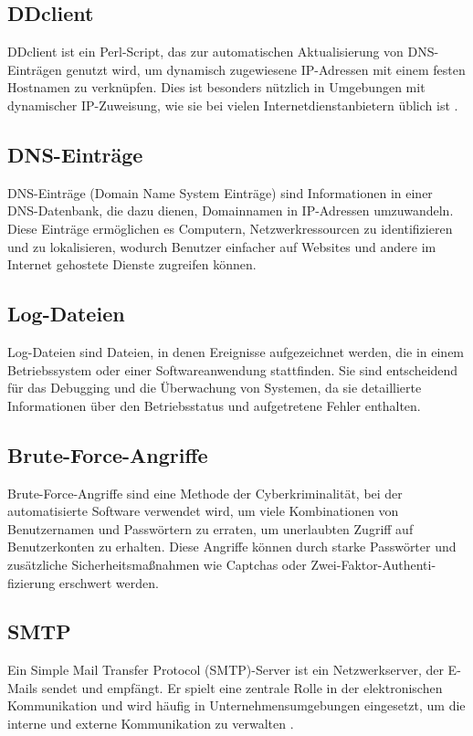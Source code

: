 \subsection{DDclient}
\label{subsec:ddclient}
DDclient ist ein Perl-Script, das zur automatischen Aktualisierung von DNS-Einträgen genutzt wird, um dynamisch zugewiesene IP-Adressen mit einem festen Hostnamen zu verknüpfen. Dies ist besonders nützlich in Umgebungen mit dynamischer IP-Zuweisung, wie sie bei vielen Internetdienstanbietern üblich ist \cite{Ddclient} \cite{Raspberry}.

\subsection{DNS-Einträge}
\label{subsec:dnsentries}
DNS-Einträge (Domain Name System Einträge) sind Informationen in einer DNS-Datenbank, die dazu dienen, Domainnamen in IP-Adressen umzuwandeln. Diese Einträge ermöglichen es Computern, Netzwerkressourcen zu identifizieren und zu lokalisieren, wodurch Benutzer einfacher auf Websites und andere im Internet gehostete Dienste zugreifen können.

\subsection{Log-Dateien}
\label{subsec:logfiles}
Log-Dateien sind Dateien, in denen Ereignisse aufgezeichnet werden, die in einem Betriebssystem oder einer Softwareanwendung stattfinden. Sie sind entscheidend für das Debugging und die Überwachung von Systemen, da sie detaillierte Informationen über den Betriebsstatus und aufgetretene Fehler enthalten.

\subsection{Brute-Force-Angriffe}
\label{subsec:bruteforce}
Brute-Force-Angriffe sind eine Methode der Cyberkriminalität, bei der automatisierte Software verwendet wird, um viele Kombinationen von Benutzernamen und Passwörtern zu erraten, um unerlaubten Zugriff auf Benutzerkonten zu erhalten. Diese Angriffe können durch starke Passwörter und zusätzliche Sicherheitsmaßnahmen wie Captchas oder Zwei-Faktor-Authenti-fizierung erschwert werden.

\subsection{SMTP}
\label{subsec:smtp}
Ein Simple Mail Transfer Protocol (SMTP)-Server ist ein Netzwerkserver, der E-Mails sendet und empfängt. Er spielt eine zentrale Rolle in der elektronischen Kommunikation und wird häufig in Unternehmensumgebungen eingesetzt, um die interne und externe Kommunikation zu verwalten \cite{Smtp}.

